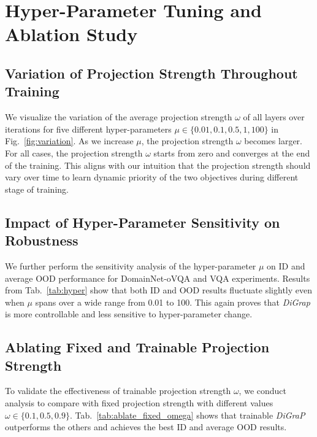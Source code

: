 \section{Hyper-Parameter Tuning and Ablation Study}

\subsection{Variation of Projection Strength Throughout Training}



We visualize the variation of the average projection strength $\omega$ of all layers over iterations for five different hyper-parameters $\mu \in \{0.01, 0.1, 0.5, 1, 100\}$ in Fig.~\ref{fig:variation}. As we increase $\mu$, the projection strength $\omega$ becomes larger. For all cases, the projection strength $\omega$ starts from zero and converges at the end of the training. This aligns with our intuition that the projection strength should vary over time to learn dynamic priority of the two objectives during different stage of training.

\subsection{Impact of Hyper-Parameter Sensitivity on Robustness}
\label{sec:sensitivity_analysis}



We further perform the sensitivity analysis of the hyper-parameter $\mu$ on ID and average OOD performance for DomainNet-oVQA and VQA experiments. Results from Tab.~\ref{tab:hyper} show that both ID and OOD results fluctuate slightly even when $\mu$ spans over a wide range from 0.01 to 100. This again proves that \emph{DiGrap} is more controllable and less sensitive to hyper-parameter change.

\subsection{Ablating Fixed and Trainable Projection Strength}
\label{sec:compare_fixed_trainable}


To validate the effectiveness of trainable projection strength $\omega$, we conduct analysis to compare with fixed projection strength with different values $\omega \in \{0.1, 0.5, 0.9\}$. Tab.~\ref{tab:ablate_fixed_omega} shows that trainable \emph{DiGraP} outperforms the others and achieves the best ID and average OOD results.


